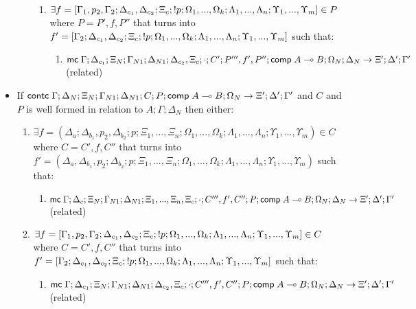 \begin{theorem}
\begin{itemize}
\begin{enumerate}
\begin{enumerate}
            \item $\exists f = [\Gamma_1, p_2, \Gamma_2; \Delta_{c_1}, \Delta_{c_2}; \Xi_c; {!} p; \Omega_1, ..., \Omega_k; \Lambda_1, ..., \Lambda_n; \Upsilon_1, ..., \Upsilon_m] \in P$ where $P = P', f, P''$ that turns into $f' = [\Gamma_2; \Delta_{c_1}, \Delta_{c_2}; \Xi_c; {!} p; \Omega_1, ..., \Omega_k; \Lambda_1, ..., \Lambda_n; \Upsilon_1, ..., \Upsilon_m]$ such that:
                  \begin{enumerate}
                     \item $\mathsf{mc} \; \Gamma; \Delta_{c_1}; \Xi_N; \Gamma_{N1}; \Delta_{N1}; \Delta_{c_2}, \Xi_c; \cdot; C'; P''', f', P''; \mathsf{comp} \; A \multimap B; \Omega_N; \Delta_N \rightarrow \Xi'; \Delta'; \Gamma'$ (related)
                  \end{enumerate}
         \end{enumerate}
      \end{enumerate}
      
   \item If $\mathsf{contc} \; \Gamma; \Delta_{N}; \Xi_{N}; \Gamma_{N1}; \Delta_{N1}; C; P; \mathsf{comp} \; A \multimap B; \Omega_N \rightarrow \Xi'; \Delta'; \Gamma'$ and $C$ and $P$ is well formed in relation to $A; \Gamma; \Delta_N$ then either:
   
   \begin{enumerate}
      \item $\exists f = (\Delta_a; \Delta_{b_1}, p_2, \Delta_{b_2}; p; \Xi_1, ..., \Xi_n; \Omega_1, ..., \Omega_k; \Lambda_1, ..., \Lambda_n; \Upsilon_1, ..., \Upsilon_m) \in C$ where $C = C', f, C''$ that turns into $f' = (\Delta_a, \Delta_{b_1}, p_2; \Delta_{b_2}; p; \Xi_1, ..., \Xi_n; \Omega_1, ..., \Omega_k; \Lambda_1, ..., \Lambda_n; \Upsilon_1, ..., \Upsilon_m)$ such that:
         \begin{enumerate}
            \item $\mathsf{mc} \; \Gamma; \Delta_c; \Xi_N; \Gamma_{N1}; \Delta_{N1}; \Xi_1, ..., \Xi_n, \Xi_c; \cdot; C''', f', C''; P; \mathsf{comp} \; A \multimap B; \Omega_N; \Delta_N \rightarrow \Xi'; \Delta'; \Gamma'$ (related)
         \end{enumerate}
         
      \item $\exists f = [\Gamma_1, p_2, \Gamma_2; \Delta_{c_1}, \Delta_{c_2}; \Xi_c; {!} p; \Omega_1, ..., \Omega_k; \Lambda_1, ..., \Lambda_n; \Upsilon_1, ..., \Upsilon_m] \in C$ where $C = C', f, C''$ that turns into $f' = [\Gamma_2; \Delta_{c_1}, \Delta_{c_2}; \Xi_c; {!} p; \Omega_1, ..., \Omega_k; \Lambda_1, ..., \Lambda_n; \Upsilon_1, ..., \Upsilon_m]$ such that:
         \begin{enumerate}
            \item $\mathsf{mc} \; \Gamma; \Delta_{c_1}; \Xi_N; \Gamma_{N1}; \Delta_{N1}; \Delta_{c_2}, \Xi_c; \cdot; C''', f', C''; P; \mathsf{comp} \; A \multimap B; \Omega_N; \Delta_N \rightarrow \Xi'; \Delta'; \Gamma'$ (related)
         \end{enumerate}
         

\end{enumerate}
\end{itemize}
\end{theorem}
